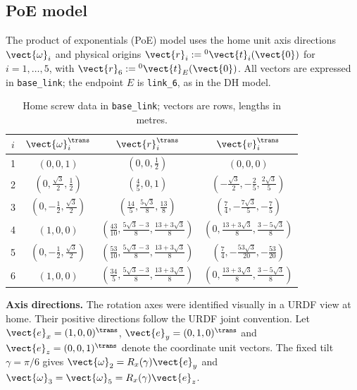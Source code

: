 \subsection{PoE model}
\label{sec:poe}

The product of exponentials (PoE) model uses the home unit axis directions
$\vect{\omega}_i$ and physical origins $\vect{r}_i:={}^0\vect{t}_i(\vect{0})$
for $i=1,\ldots,5$, with $\vect{r}_6:={}^0\vect{t}_E(\vect{0})$.
All vectors are expressed in \texttt{base\_link}; the endpoint $E$ is
\texttt{link\_6}, as in the DH model.

\begingroup
\setlength{\intextsep}{6pt}
\setlength{\columnsep}{12pt}
\begin{table}
\centering
\caption{Home screw data in \texttt{base\_link}; vectors are rows, lengths in metres.}
\label{tab:poe-screws}
\small
\setlength{\tabcolsep}{5pt}
\renewcommand{\arraystretch}{1.55}
\begin{tabular}{@{}c c c c@{}}
\toprule
$i$ & $\vect{\omega}_i^\trans$ & $\vect{r}_i^\trans$ & $\vect{v}_i^\trans$ \\
\midrule
1 & $(0,0,1)$ & $(0,0,\tfrac12)$ & $(0,0,0)$ \\
2 & $(0,\tfrac{\sqrt3}{2},\tfrac12)$ & $(\tfrac45,0,1)$
  & $(-\tfrac{\sqrt3}{2},-\tfrac25,\tfrac{2\sqrt3}{5})$ \\
3 & $(0,-\tfrac12,\tfrac{\sqrt3}{2})$ & $(\tfrac{14}{5},\tfrac{5\sqrt3}{8},\tfrac{13}{8})$
  & $(\tfrac74,-\tfrac{7\sqrt3}{5},-\tfrac75)$ \\
4 & $(1,0,0)$ & $(\tfrac{43}{10},\tfrac{5\sqrt3-3}{8},\tfrac{13+3\sqrt3}{8})$
  & $(0,\tfrac{13+3\sqrt3}{8},\tfrac{3-5\sqrt3}{8})$ \\
5 & $(0,-\tfrac12,\tfrac{\sqrt3}{2})$
  & $(\tfrac{53}{10},\tfrac{5\sqrt3-3}{8},\tfrac{13+3\sqrt3}{8})$
  & $(\tfrac74,-\tfrac{53\sqrt3}{20},-\tfrac{53}{20})$ \\
6 & $(1,0,0)$ & $(\tfrac{34}{5},\tfrac{5\sqrt3-3}{8},\tfrac{13+3\sqrt3}{8})$
  & $(0,\tfrac{13+3\sqrt3}{8},\tfrac{3-5\sqrt3}{8})$ \\
\bottomrule
\end{tabular}
\end{table}

\textbf{Axis directions.}
The rotation axes were identified visually in a URDF view at home.
Their positive directions follow the URDF joint convention.
Let $\vect{e}_x=(1,0,0)^\trans$, $\vect{e}_y=(0,1,0)^\trans$ and
$\vect{e}_z=(0,0,1)^\trans$ denote the coordinate unit vectors.
The fixed tilt $\gamma=\pi/6$ gives $\vect{\omega}_2=R_x(\gamma)\vect{e}_y$
and $\vect{\omega}_3=\vect{\omega}_5=R_x(\gamma)\vect{e}_z$.

